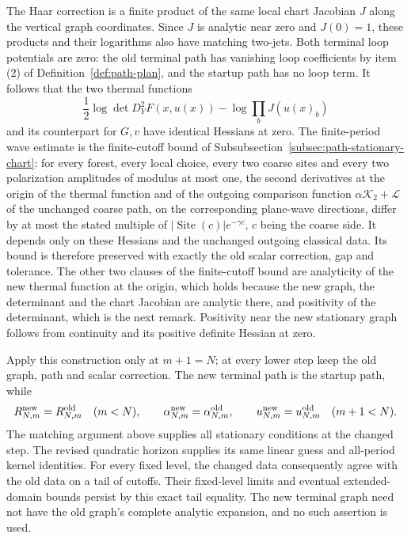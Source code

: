 The Haar correction is a finite product of the same local chart
Jacobian $J$ along the vertical graph coordinates. Since $J$ is
analytic near zero and $J(0)=1$, these products and their
logarithms also have matching two-jets. Both terminal loop
potentials are zero: the old terminal path has vanishing loop
coefficients by item (2) of Definition~\ref{def:path-plan}, and the
startup path has no loop term. It follows that the two thermal functions
\[
 \frac12\log\det D_Y^2F(x,u(x))
       -\log\!\prod_b J(u(x)_b)
\]
and its counterpart for $G,v$ have identical Hessians at zero.
The finite-period wave estimate is the finite-cutoff bound of
Subsubsection~\ref{subsec:path-stationary-chart}: for every forest, every
local choice, every two coarse sites and every two polarization
amplitudes of modulus at most one, the second derivatives at the
origin of the thermal function and of the outgoing comparison
function $\alpha\mathcal K_2+\mathcal L$ of the unchanged coarse
path, on the corresponding plane-wave directions, differ by at most
the stated multiple of $|\operatorname{Site}(c)|e^{-\gamma c}$,
$c$ being the coarse side. It depends only on these Hessians and
the unchanged outgoing classical data. Its bound is therefore
preserved with exactly the old scalar correction, gap and
tolerance. The other two clauses of the finite-cutoff bound are
analyticity of the new thermal function at the origin, which holds
because the new graph, the determinant and the chart Jacobian are
analytic there, and positivity of the determinant, which is the next
remark. Positivity near the new stationary graph follows from
continuity and its positive definite Hessian at zero.

Apply this construction only at $m+1=N$; at every lower step keep
the old graph, path and scalar correction. The new terminal path
is the startup path, while
\[
 R^{\rm new}_{N,m}=R^{\rm old}_{N,m}\quad(m<N),\qquad
 \alpha^{\rm new}_{N,m}=\alpha^{\rm old}_{N,m},
 \qquad u^{\rm new}_{N,m}=u^{\rm old}_{N,m}\quad(m+1<N).
\]
The matching argument above supplies all stationary conditions at
the changed step. The revised quadratic horizon supplies its same
linear guess and all-period kernel identities. For every fixed
level, the changed data consequently agree with the old data on
a tail of cutoffs. Their fixed-level limits and eventual
extended-domain bounds persist by this exact tail equality.
The new terminal graph need not have the old graph's complete
analytic expansion, and no such assertion is used.

